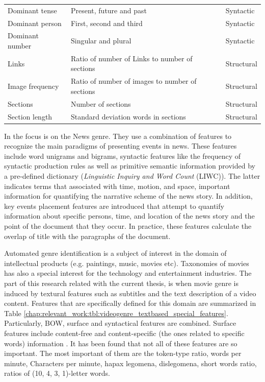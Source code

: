 \begin{table}[t]
\begin{tabular}{p{3cm}p{7cm}p{3cm}}
        Dominant tense & Present, future and past & Syntactic \\
        Dominant person & First, second and third & Syntactic \\
        Dominant number & Singular and plural & Syntactic \\
		Links & Ratio of number of Links to number of sections  & Structural \\
        Image frequency & Ratio of number of images to number of sections  & Structural \\
        Sections & Number of sections & Structural \\
        Section length & Standard deviation words in sections & Structural \\
		\hline
	\end{tabular}
\end{table}

In \parencite{dai2018fine} the focus is on the News genre. They use a combination of features to recognize the main paradigms of presenting events in news. These features include word unigrams and bigrams, syntactic features like the frequency of syntactic production rules as well as primitive semantic information provided by a pre-defined dictionary (\textit{Linguistic Inquiry and Word Count} (LIWC)). The latter indicates terms that associated with time, motion, and space, important information for quantifying the narrative scheme of the news story. In addition, key events placement features are introduced that attempt to quantify information about specific persons, time, and location of the news story and the point of the document that they occur. In practice, these features calculate the overlap of title with the paragraphs of the document.

Automated genre identification is a subject of interest in the domain of intellectual products (e.g. paintings, music, movies etc). Taxonomies of movies has also a special interest for the technology and entertainment industries. The part of this research related with the current thesis, is when movie genre is induced by textural features such as subtitles and the text description of a video content. Features that are specifically defined for this domain are summarized in Table \ref{chap:relevant_work:tbl:videogenre_textbased_special_features}. Particularly, BOW, surface and syntactical features are combined. Surface features include content-free and content-specific (the ones related to specific words) information \parencite{lee2017text}. It has been found that not all of these features are so important. The most important of them are the token-type ratio, words per minute, Characters per minute, hapax legomena, dislegomena, short words ratio, ratios of (10, 4, 3, 1)-letter words. 

